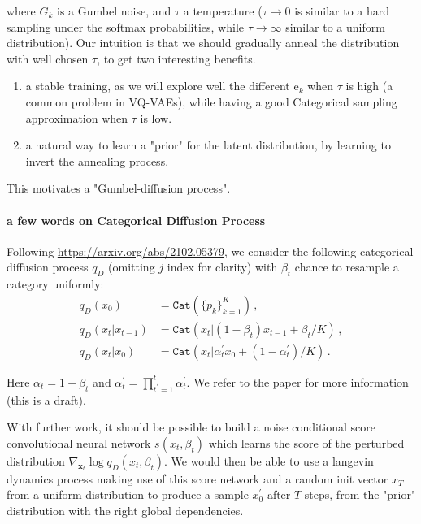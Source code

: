 \documentclass{article}
\newcommand{\x}{\mathbf{x}}
\newcommand{\rme}{\mathrm{e}}
\begin{document}
where $G_k$ is a Gumbel noise, and $\tau$ a temperature ($\tau \rightarrow 0$ is similar to a hard sampling under the softmax probabilities, while $\tau \rightarrow \infty$ similar to a uniform distribution). Our intuition is that we should gradually anneal the distribution with well chosen $\tau$, to get two interesting benefits.
\begin{enumerate}
	\item a stable training, as we will explore well the different $\rme_k$ when $\tau$ is high (a common problem in VQ-VAEs), while having a good Categorical sampling approximation when $\tau$ is low.
	\item a natural way to learn a "prior" for the latent distribution, by learning to invert the annealing process.
\end{enumerate}
This motivates a "Gumbel-diffusion process".

\paragraph{a few words on Categorical Diffusion Process}
Following \url{https://arxiv.org/abs/2102.05379}, we consider the following categorical diffusion process $q_D$ (omitting $j$ index for clarity) with $\beta_t$ chance to resample a category uniformly:
\begin{align*}
	q_D(x_0) &= \texttt{Cat}(\{p_k\}_{k=1}^K)\,, \\
	q_D(x_t | x_{t−1}) &= \texttt{Cat}(x_t|(1 − \beta_t)x_{t−1} + \beta_t/K)\,, \\
	q_D(x_t|x_0) &= \texttt{Cat}(x_t|\alpha^\prime_t x_0 + (1 − \alpha^\prime_t)/K)\,.
\end{align*}

Here $\alpha_t = 1 − \beta_t$ and $\alpha^\prime_t = \prod_{t^\prime=1}^t \alpha_t^\prime$. We refer to the paper for more information (this is a draft).

With further work, it should be possible to build a noise conditional score convolutional neural network $s(x_t, \beta_t)$ which learns the score of the perturbed distribution $\nabla_{\x_t} \log q_D(x_t, \beta_t)$. We would then be able to use a langevin dynamics process making use of this score network and a random init vector $x_T$ from a uniform distribution to produce a sample $x_0^\prime$ after $T$ steps, from the "prior" distribution with the right global dependencies.
\end{document}
